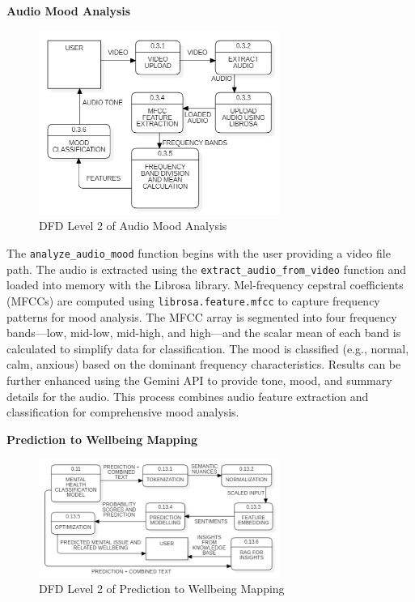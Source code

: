 \vspace{2em}

\noindent
\textbf{Audio Mood Analysis}

\begin{figure}[h!]  
    \centering
    \includegraphics[width=0.7\textwidth]{Images/DFD L2 AM.png}  
    \caption*{DFD Level 2 of Audio Mood Analysis}
    \label{dfdl671}  %
\end{figure}

\pagebreak

\noindent
The \texttt{analyze\_audio\_mood} function begins with the user providing a video file path. The audio is extracted using the \texttt{extract\_audio\_from\_video} function and loaded into memory with the Librosa library. Mel-frequency cepstral coefficients (MFCCs) are computed using \texttt{librosa.feature.mfcc} to capture frequency patterns for mood analysis. The MFCC array is segmented into four frequency bands—low, mid-low, mid-high, and high—and the scalar mean of each band is calculated to simplify data for classification. The mood is classified (e.g., normal, calm, anxious) based on the dominant frequency characteristics. Results can be further enhanced using the Gemini API to provide tone, mood, and summary details for the audio. This process combines audio feature extraction and classification for comprehensive mood analysis.

\vspace{2em}

\noindent
\textbf{Prediction to Wellbeing Mapping}

\begin{figure}[h!]  
    \centering
    \includegraphics[width=0.7\textwidth]{Images/DFD L2 MW.png}  
    \caption*{DFD Level 2 of Prediction to Wellbeing Mapping}
    \label{dfdl166}  %
\end{figure}

